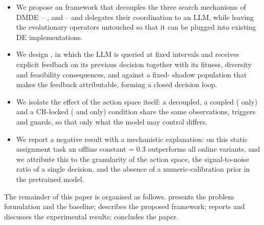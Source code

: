\begin{itemize}
  \item We propose an \llmdmde{} framework that decouples the three search
        mechanisms of DMDE -- \CR{}, \Ffactor{} and \GMR{} -- and delegates
        their coordination to an LLM, while leaving the evolutionary operators
        untouched so that it can be plugged into existing DE implementations.
  \item We design \searchctrl{}, in which the LLM is queried at fixed intervals
        and receives explicit feedback on its previous decision together with
        its fitness, diversity and feasibility consequences, and against a
        fixed-\CR{} shadow population that makes the feedback attributable,
        forming a closed decision loop.
  \item We isolate the effect of the action space itself: a decoupled, a
        coupled (\CR{} only) and a CR-locked (\Ffactor{} and \GMR{} only)
        condition share the same observations, triggers and guards, so that
        only what the model may control differs.
  \item We report a negative result with a mechanistic explanation: on this
        static assignment task an offline constant \CR{} = 0.3 outperforms all
        online variants, and we attribute this to the granularity of the action
        space, the signal-to-noise ratio of a single decision, and the absence
        of a numeric-calibration prior in the pretrained model.
\end{itemize}

The remainder of this paper is organised as follows. 
presents the problem formulation and the \dmde{} baseline; 
describes the proposed framework;  reports and
discusses the experimental results;  concludes the paper.
